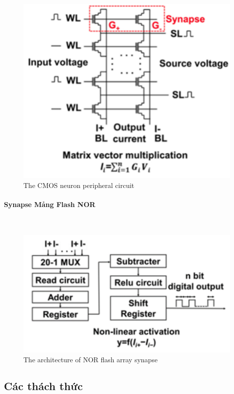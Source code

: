 \documentclass[a4paper]{article}
\begin{document}
\begin{figure}[H]
    \centering
    \includegraphics[width=0.5\linewidth]{assets/asic-f7.png}
    \caption{The CMOS neuron peripheral circuit}
    \label{fig:enter-label}
\end{figure}
\paragraph{Synapse Mảng Flash NOR} \leavevmode\\

\begin{figure}
    \centering
    \includegraphics[width=0.5\linewidth]{assets/asic-8.png}
    \caption{The architecture of NOR flash array synapse}
    \label{fig:enter-label}
\end{figure}

\subsection{Các thách thức}
\end{document}
